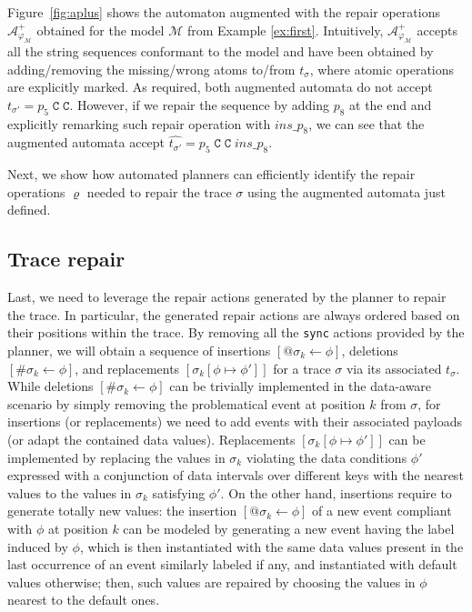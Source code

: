 Figure~\ref{fig:aplus} shows the automaton augmented with the repair operations $\mathcal{A}_{\varphi_{\mathcal{M}}}^+$ obtained for the model $\mathcal{M}$ from Example \ref{ex:first}. Intuitively, $\mathcal{A}_{\varphi_{\mathcal{M}}}^+$ accepts all the string sequences conformant to the model and have been obtained by adding/removing the missing/wrong atoms to/from $t_\sigma$, where atomic operations are explicitly marked. As required, both augmented automata do not accept $t_{\sigma'}=p_5\;\texttt{C}\;\texttt{C}$. However, if we repair the sequence by adding $p_8$ at the end and explicitly remarking such repair operation with $\textit{ins\_}p_8$, we can see that the augmented automata accept $\hat{t_{\sigma'}}=p_5\;\texttt{C}\;\texttt{C}\;\textit{ins\_}p_8$.

Next, we show how automated planners can efficiently identify the repair operations $\varrho$ needed to repair the trace $\sigma$ using the augmented automata just defined.




\subsection{Trace repair}\label{ssec:trerepair}


Last, we need to leverage the repair actions generated by the planner to repair the trace. In particular, the generated repair actions are always ordered based on their positions within the trace. By removing all the \texttt{sync} actions provided by the planner, we will obtain a sequence of insertions $[@\sigma_k\leftarrow \phi]$, deletions $[\#\sigma_k\leftarrow \phi]$, and replacements $[\sigma_k[\phi\mapsto \phi']]$ for a trace $\sigma$ via its associated $t_\sigma$. While deletions $[\#\sigma_k\leftarrow \phi]$ can be trivially implemented in the data-aware scenario by simply removing the problematical event at position $k$ from $\sigma$, for insertions (or replacements) we need to add events with their associated payloads (or adapt the contained data values). Replacements $[\sigma_k[\phi\mapsto \phi']]$ can be  implemented by replacing the values in $\sigma_k$ violating the data conditions $\phi'$ expressed with a conjunction of data intervals over different keys with the nearest values to the values in $\sigma_k$ satisfying $\phi'$. On the other hand, insertions require to generate totally new values: the insertion $[@\sigma_k\leftarrow \phi]$ of a new event compliant with $\phi$ at position $k$ can be modeled by generating a new event having the label induced by $\phi$, which is then instantiated with the same data values present in the last occurrence of an event similarly labeled if any, and instantiated with default values otherwise; then, such values are repaired by choosing the values in $\phi$ nearest to the default ones.

